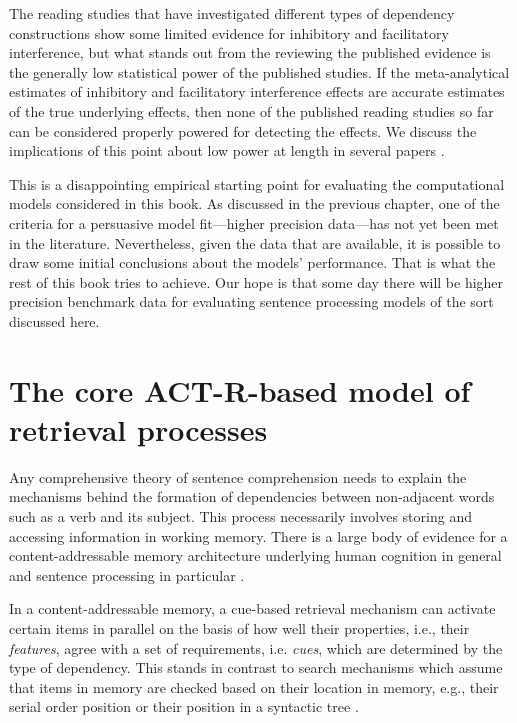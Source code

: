 \documentclass{cambridge7A}\usepackage[]{graphicx}\usepackage[]{color}
\begin{document}
The reading studies that have investigated different types of dependency constructions show some limited evidence for inhibitory and facilitatory interference, but what stands out from the reviewing the published evidence \citep{JaegerEngelmannVasishth2017} is the generally low statistical power of the published studies. If the meta-analytical estimates of inhibitory and facilitatory interference effects are accurate estimates of the true underlying effects, then none of the published reading studies so far can be considered properly powered for detecting the effects. We discuss the implications of this point about low power at length in several papers \citep{VasishthMertzenJaegerGelman2018,nicenboimexploratory,JaegerMertzenVanDykeVasishth2019,NicenboimPreactivation2019}.

This is a disappointing empirical starting point for evaluating the computational models considered in this book. As discussed in the previous chapter, one of the \citep{rp} criteria for a persuasive model fit---higher precision  data---has not yet been met in the literature.  Nevertheless, given the data that are available, it is possible to draw some initial conclusions  about the models' performance. That is what the rest of this book tries to achieve. Our hope is that some day there will be higher precision benchmark data for evaluating sentence processing models of the sort discussed here.      


\chapter{The core ACT-R-based model of retrieval processes} \label{c02}

Any comprehensive theory of sentence comprehension needs to explain the mechanisms behind the formation of dependencies between non-adjacent words such as a verb and its subject. This process necessarily involves storing and accessing information in working memory.  There is a large body of evidence for a content-addressable memory architecture underlying human cognition in general \citep{WatkinsWatkins1975, AndersonLebiere1998,AndersonEtAl2004,Ratcliff1978} and sentence processing in particular \citep{McElree2000,McElreeForakerDyer2003, VanDykeLewis2003, LewisVasishth2005, VanDykeMcElree2011}. 

In a content-addressable memory, a cue-based retrieval mechanism can activate certain items in parallel on the basis of how well their properties, i.e., their \textit{features}, agree with a set of requirements, i.e. \textit{cues}, which are determined by the type of dependency.
This stands in contrast to search mechanisms which assume that items in memory are checked based on their location in memory, e.g., their  serial order position \citep{Sternberg1966,Sternberg1969,BerwickWeinberg1984} or their position in a syntactic tree \citep{Sturt2003}. 
\end{document}

